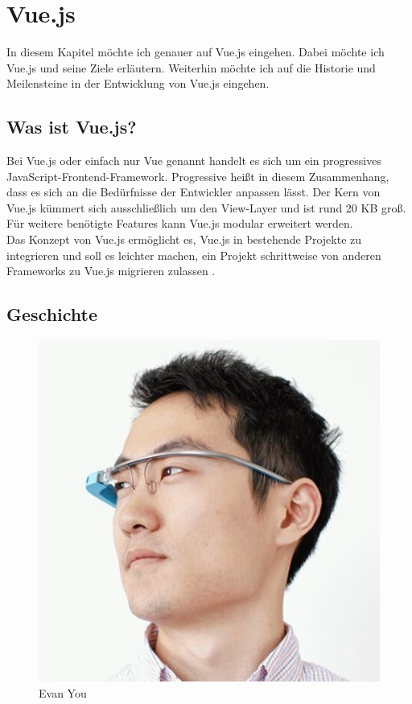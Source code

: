 %
\chapter{Vue.js}
In diesem Kapitel möchte ich genauer auf Vue.js eingehen.
Dabei möchte ich Vue.js und seine Ziele erläutern.
Weiterhin möchte ich auf die Historie und Meilensteine in der Entwicklung von Vue.js eingehen.


\section{Was ist Vue.js?}
Bei Vue.js oder einfach nur Vue genannt handelt es sich um ein progressives JavaScript-Frontend-Framework.
Progressive heißt in diesem Zusammenhang,
dass es sich an die Bedürfnisse der Entwickler anpassen lässt.
Der Kern von Vue.js kümmert sich ausschließlich um den View-Layer und ist rund 20 KB groß.
Für weitere benötigte Features kann Vue.js modular erweitert werden. \cite[S. 523-524]{bin2019}
\\
Das Konzept von Vue.js ermöglicht es, Vue.js in bestehende Projekte zu integrieren
und soll es leichter machen, ein Projekt
schrittweise von anderen Frameworks zu Vue.js migrieren zulassen \cite[S. 1]{peterke2019}.


\section{Geschichte}\label{sec:geschichte}

\begin{figure}[!htb]
    \centering
    \includegraphics[width=.2\textwidth]{img/you}
    \caption{Evan You \cite{linkedinYou}}
    \label{fig:you}
\end{figure}

